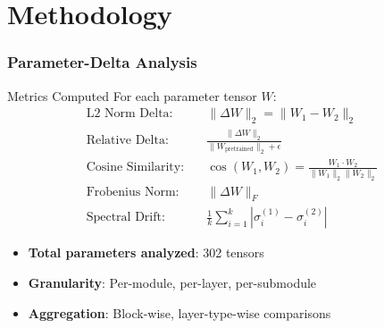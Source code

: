 \documentclass[aspectratio=1610, fontsize=8pt]{beamer}
\begin{document}
\section{Methodology}

\begin{frame}
    \frametitle{Parameter-Delta Analysis}
    \begin{block}{Metrics Computed}
        For each parameter tensor $W$:
        \begin{align}
            \text{L2 Norm Delta:} \quad &\|\Delta W\|_2 = \|W_1 - W_2\|_2 \\
            \text{Relative Delta:} \quad &\frac{\|\Delta W\|_2}{\|W_{\text{pretrained}}\|_2 + \epsilon} \\
            \text{Cosine Similarity:} \quad &\cos(W_1, W_2) = \frac{W_1 \cdot W_2}{\|W_1\|_2 \|W_2\|_2} \\
            \text{Frobenius Norm:} \quad &\|\Delta W\|_F \\
            \text{Spectral Drift:} \quad &\frac{1}{k}\sum_{i=1}^{k} |\sigma_i^{(1)} - \sigma_i^{(2)}|
        \end{align}
    \end{block}
    
    \vspace{0.3cm}
    \begin{itemize}
        \item \textbf{Total parameters analyzed}: 302 tensors
        \item \textbf{Granularity}: Per-module, per-layer, per-submodule
        \item \textbf{Aggregation}: Block-wise, layer-type-wise comparisons
    \end{itemize}
\end{frame}
\end{document}
